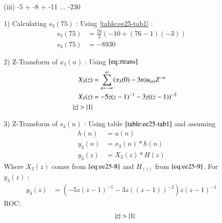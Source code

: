 \documentclass[journal,12pt,onecolumn]{IEEEtran}
\theoremstyle{remark}
\begin{document}
\begin{enumerate}
\vspace{0.5cm} 
\item[(iii)]
-5 + -8 + -11 ... -230
\vspace{0.5cm}
\end{enumerate}

\begin{enumerate}
Using \ref{table:ee25-tab1}
\begin{align}
x_3(n) &= (x_3(0) -3n)u_{(n)}\\
-230 &= -5 -3n \\
n &= 75
\end{align}
\item[1)]
Calculating $s_3(75)$ :
Using \ref{table:ee25-tab1} :
\begin{align}
    s_3(75) &= \frac{76}{2}(-10+(76-1)(-3))\\
   s_3(75) &= -8930
    \end{align}
    \end{enumerate}

\begin{enumerate}
\item[2)] 
Z-Transform of $x_3(n)$ :
Using $\eqref{eq:ztrans}$
\begin{align}
X_3(z) &= \sum_{n=-\infty}^{\infty}(x_3(0) -3n)u_{(n)}Z^{-n} \\
X_3(z) &=  -5z(z-1)^{-1}-
       3z((z-1))^{-2} \label{eq:ee25-8}\\
\quad \left\vert z\right\vert>\left\vert1\right\vert 
\end{align}
\end{enumerate}

\begin{enumerate}
    \vspace{0.5cm}
\item[3)]
Z-Transform of $s_3(n)$ :
Using table $\ref{table:ee25-tab1}$ and assuming 
\begin{align}
         h(n) &= u(n) \\
    y_3(n) &= x_3(n) * h(n) \\
    y_3(z) &= X_3(z) * H(z)
    \end{align}
    Where $X_3(z)$ comes from $\eqref{eq:ee25-8}$ and $H_(z)$ from $\eqref{eq:ee25-9}$.
    For $y_3(z)$ :
    \begin{align}
            y_3(z) &= (-5z(z-1)^{-1}-
       3z((z-1))^{-2})z(z-1)^{-1}
    \end{align}
    ROC:
    \begin{align} 
\quad \left\vert z\right\vert>\left\vert1\right\vert 
    \end{align}
    \end{enumerate}
\end{document}
